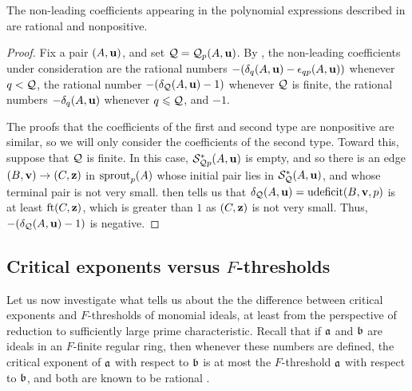\documentclass{amsart}
\begin{document}
\begin{proposition}
\label{non-leading coefficients: P}
The non-leading coefficients appearing in the polynomial expressions described in  are rational and nonpositive.
\end{proposition}

\begin{proof}
   Fix a pair $(A,\mathbf{u})$, and set $\mathcal{Q}=\mathcal{Q}_p(A,\mathbf{u})$.
   By , the non-leading coefficients under consideration are the rational numbers $-(\delta_{q}(A,\mathbf{u})-\epsilon_{qp}(A,\mathbf{u}))$ whenever $q < \mathcal{Q}$, the rational number $-(\delta_{\mathcal{Q}}(A,\mathbf{u}) - 1)$ whenever $\mathcal{Q}$ is finite, the rational numbers $-\delta_q(A,\mathbf{u})$ whenever $q\leqslant \mathcal{Q}$, and $-1$.

   The proofs that the coefficients of the first and second type are nonpositive are similar, so we will only consider the coefficients of the second type.
   Toward this, suppose that $\mathcal{Q}$ is finite.
   In this case, $\mathcal{S}^{\ast}_{\mathcal{Q} p}(A,\mathbf{u})$ is empty, and so there is an edge $(B,\mathbf{v}) \to (C,\mathbf{z})$ in $\operatorname{sprout}_p(A)$ whose initial pair lies in $\mathcal{S}^{\ast}_{\mathcal{Q}}(A,\mathbf{u})$, and whose terminal pair is not very small.  then tells us that $\delta_{\mathcal{Q}}(A,\mathbf{u}) = \operatorname{udeficit}(B,\mathbf{v},p)$ is at least $\operatorname{ft}(C, \mathbf{z})$, which is greater than $1$ as $(C,\mathbf{z})$ is not very small.
   Thus, $-(\delta_{\mathcal{Q}}(A,\mathbf{u})-1)$ is negative.
\end{proof}

\subsection{Critical exponents versus $F$-thresholds}
\label{crit versus ft: SS}

Let us now investigate what  tells us about the the difference between critical exponents and $F$-thresholds of monomial ideals, at least from the perspective of reduction to sufficiently large prime characteristic.
Recall that if $\mathfrak{a}$ and $\mathfrak{b}$ are ideals in an $F$-finite regular ring, then whenever these numbers are defined, the critical exponent of $\mathfrak{a}$ with respect to $\mathfrak{b}$ is at most the $F$-threshold $\mathfrak{a}$ with respect to $\mathfrak{b}$, and both are known to be rational \cite[Corollary~5.8]{hernandez+etal.frobenius_powers}.
\end{document}
